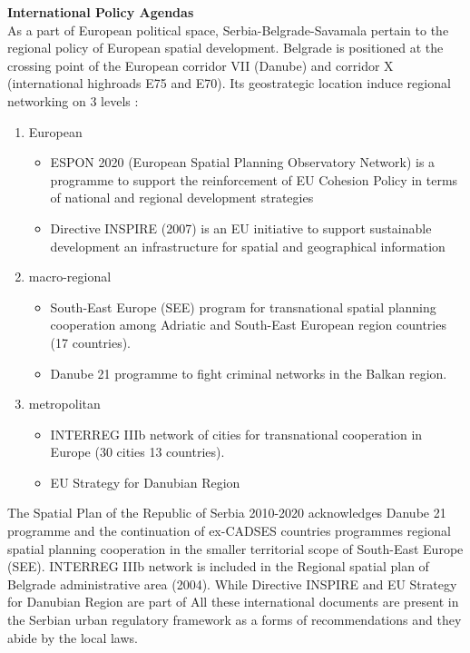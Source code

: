 \documentclass[11pt]{report}
\begin{document}
\textbf{International Policy Agendas}
\\
As a part of European political space, Serbia-Belgrade-Savamala pertain to the regional policy of European spatial development. Belgrade is positioned at the crossing point of the European corridor VII (Danube) and corridor X (international highroads E75 and E70). Its geostrategic location induce regional networking on 3 levels \cite{Stupar 2004}:
\begin{enumerate}
\item European
\begin{itemize}
\item ESPON 2020 (European Spatial Planning Observatory Network) is a programme to support the reinforcement of EU Cohesion Policy in terms of national and regional development strategies
\item Directive INSPIRE (2007) is an EU initiative to support sustainable development an infrastructure for spatial and geographical information 
\end{itemize}
\item macro-regional
\begin{itemize}
\item South-East Europe (SEE) program for transnational spatial planning cooperation among Adriatic and South-East European region countries (17 countries). 
\item Danube 21 programme to fight criminal networks in the Balkan region.
\end{itemize}
\item metropolitan
\begin{itemize}
\item INTERREG IIIb network of cities for transnational cooperation in Europe (30 cities 13 countries).
\item EU Strategy for Danubian Region
\end{itemize}
\end{enumerate}
The Spatial Plan of the Republic of Serbia 2010-2020 acknowledges  Danube 21 programme and the continuation of ex-CADSES countries programmes regional spatial planning cooperation in the smaller territorial scope of South-East Europe (SEE). INTERREG IIIb network is  included in the Regional  spatial  plan  of  Belgrade  administrative  area  (2004).
While Directive INSPIRE and EU Strategy for Danubian Region are part of 
All these international documents are present in the Serbian urban regulatory framework as a forms of recommendations and they abide by the local laws. 
\end{document}
